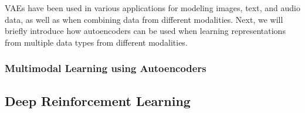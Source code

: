 VAEs have been used in various applications for modeling images, text, and audio data, as well as when combining data from different modalities. Next, we will briefly introduce how autoencoders can be used when learning representations from multiple data types from different modalities. 



\subsubsection{Multimodal Learning using Autoencoders}


\subsection{Deep Reinforcement Learning}











